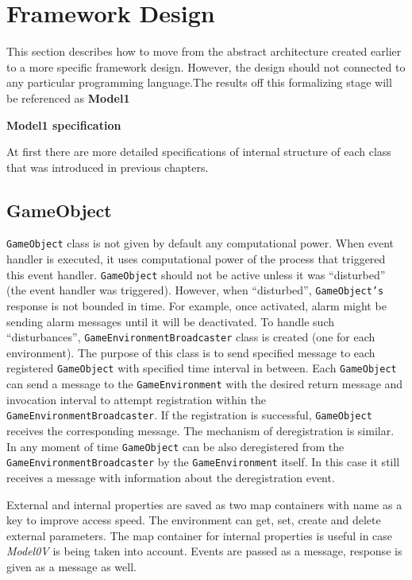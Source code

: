 \section{Framework Design}
This section describes how to move from the abstract architecture created earlier to a more specific framework design. However, the design should not connected to any particular programming language.The results off this formalizing stage will be referenced as \textbf{Model1}
\begin{center}
    \textbf{Model1 specification}
\end{center}
At first there are more detailed specifications of internal structure of each class that was introduced in previous chapters.
\subsection{GameObject}
\texttt{GameObject} class is not given by default  any computational power. When event handler is executed, it uses computational power of the process that triggered this event handler. \texttt{GameObject} should not be active unless it was ``disturbed'' (the event handler was triggered). However, when ``disturbed'', \texttt{GameObject's} response is not bounded in time. For example, once activated, alarm might be sending alarm messages until it will be deactivated. To handle such ``disturbances'', \texttt{GameEnvironmentBroadcaster} class is created (one for each environment). The purpose of this class is to send specified message to each registered \texttt{GameObject} with specified time interval in between. Each \texttt{GameObject}  can send a message to the \texttt{GameEnvironment} with the desired return message and invocation interval to attempt registration within the \texttt{GameEnvironmentBroadcaster}. If the registration is successful, \texttt{GameObject} receives the corresponding message. The mechanism of deregistration is similar. In any moment of time \texttt{GameObject} can be also deregistered from the \texttt{GameEnvironmentBroadcaster} by the \texttt{GameEnvironment} itself. In this case it still receives a message with information about the deregistration event.\par
External and internal properties are saved as two map containers with name as a key to improve access speed. The environment can get, set, create and delete external parameters.
The map container for internal properties is useful in case \textit{Model0V} is being taken into account.
Events are passed as a message, response is given as a message as well.

